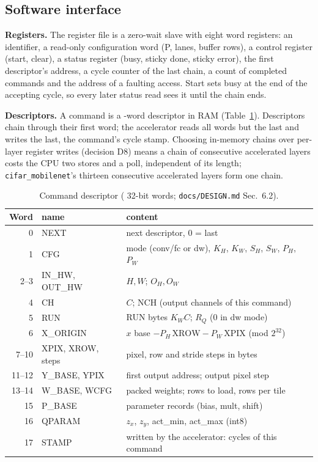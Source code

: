 \documentclass[journal]{IEEEtran}
\begin{document}
\subsection{Software interface}
\textbf{Registers.} The register file is a zero-wait slave with eight word registers: an identifier, a read-only configuration word (P, lanes, buffer rows), a control register (start, clear), a status register (busy, sticky done, sticky error), the first descriptor's address, a cycle counter of the last chain, a count of completed commands and the address of a faulting access. Start sets busy at the end of the accepting cycle, so every later status read sees it until the chain ends.

\textbf{Descriptors.} A command is a \DescWords-word descriptor in RAM (Table~\ref{tab:desc}). Descriptors chain through their first word; the accelerator reads all words but the last and writes the last, the command's cycle stamp. Choosing in-memory chains over per-layer register writes (decision D8) means a chain of consecutive accelerated layers costs the CPU two stores and a poll, independent of its length; \texttt{cifar\_mobilenet}'s thirteen consecutive accelerated layers form one chain.

\begin{table}[t]\centering
\caption{Command descriptor (\DescWords{} 32-bit words; \texttt{docs/DESIGN.md} Sec.~6.2).}\label{tab:desc}
\footnotesize\setlength{\tabcolsep}{3pt}
\begin{tabular}{rlp{}}\toprule
Word & name & content\\\midrule
0 & NEXT & next descriptor, 0 = last\\
1 & CFG & mode (conv/fc or dw), $K_H$, $K_W$, $S_H$, $S_W$, $P_H$, $P_W$\\
2--3 & IN\_HW, OUT\_HW & $H, W$; $O_H, O_W$\\
4 & CH & $C$; NCH (output channels of this command)\\
5 & RUN & RUN bytes $K_W C$; $R_Q$ (0 in dw mode)\\
6 & X\_ORIGIN & $x$ base $-P_H\,\mathrm{XROW}-P_W\,\mathrm{XPIX}$ (mod $2^{32}$)\\
7--10 & XPIX, XROW, steps & pixel, row and stride steps in bytes\\
11--12 & Y\_BASE, YPIX & first output address; output pixel step\\
13--14 & W\_BASE, WCFG & packed weights; rows to load, rows per tile\\
15 & P\_BASE & parameter records (bias, mult, shift)\\
16 & QPARAM & $z_x$, $z_y$, act\_min, act\_max (int8)\\
17 & STAMP & written by the accelerator: cycles of this command\\\bottomrule
\end{tabular}
\end{table}
\end{document}
